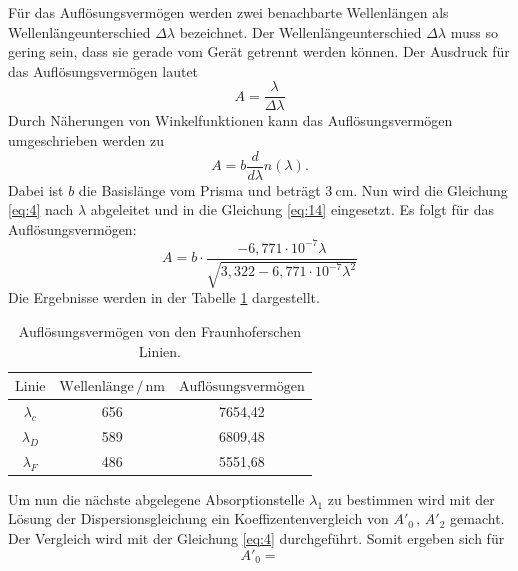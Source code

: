Für das Auflösungsvermögen werden zwei benachbarte Wellenlängen
als Wellenlängeunterschied $\Delta\lambda$ bezeichnet. Der Wellenlängeunterschied $\Delta\lambda$ muss
so gering sein, dass sie gerade vom Gerät getrennt werden können.
Der Ausdruck für das Auflösungsvermögen lautet
\begin{equation*}
  A = \frac{\lambda}{\Delta\lambda}
\end{equation*}
Durch Näherungen von Winkelfunktionen kann das Auflösungsvermögen umgeschrieben werden zu
\begin{equation}
  A = b \frac{d}{d\lambda} n(\lambda).
  \label{eq:14}
\end{equation}
Dabei ist $b$ die Basislänge vom Prisma und beträgt $\SI{3}{\centi\meter}$.
Nun wird die Gleichung \ref{eq:4} nach $\lambda$ abgeleitet und in die Gleichung \ref{eq:14}
eingesetzt.
Es folgt für das Auflösungsvermögen:
\begin{equation}
  A = b \cdot \frac{-6,771\cdot10^{-7} \lambda}{\sqrt{3,322 - 6,771\cdot10^{-7} \lambda^2}}
\end{equation}
Die Ergebnisse werden in der Tabelle \ref{tab:4} dargestellt.
\begin{table}[H]
  \centering
  \caption{Auflösungsvermögen von den Fraunhoferschen Linien.}
  \label{tab:4}
  \begin{tabular}{c c c}
    \toprule
    $\text{Linie}$ & $\text{Wellenlänge} \,/\,\si{\nano\meter}$ & $\text{Auflösungsvermögen}$\\
    \midrule
    $\lambda_c$ & 656 & 7654,42 \\
    $\lambda_D$ & 589 & 6809,48\\
    $\lambda_F$ & 486 & 5551,68\\
    \bottomrule
  \end{tabular}
\end{table}

Um nun die nächste abgelegene Absorptionstelle $\lambda_1$ zu bestimmen wird
mit der Lösung der Dispersionsgleichung ein Koeffizentenvergleich von $A'_0 \, ,\, A'_2$ gemacht.
Der Vergleich wird mit der Gleichung \ref{eq:4} durchgeführt.
Somit ergeben sich für 
\begin{equation*}
  A'_0 =
\end{equation*}
